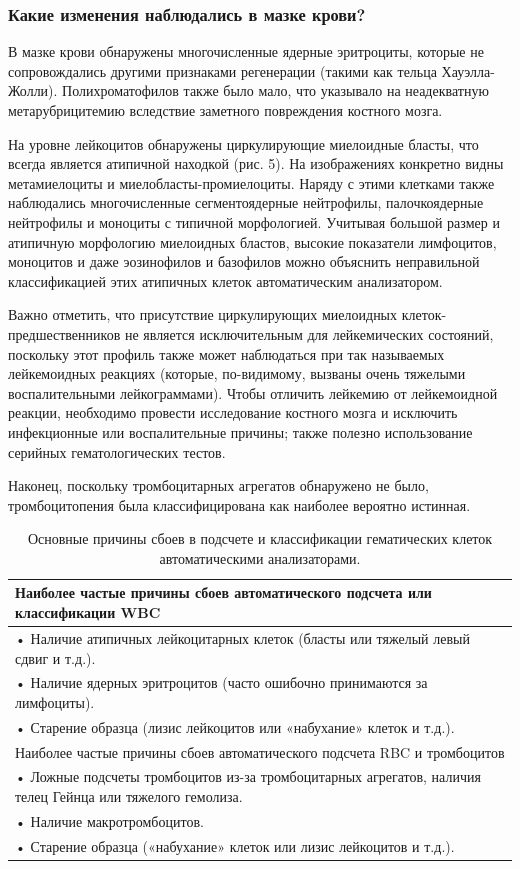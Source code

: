 \documentclass[a4paper,12pt]{book}
\begin{document}
\subsubsection*{Какие изменения наблюдались в мазке крови?}
В мазке крови обнаружены многочисленные ядерные эритроциты, которые не сопровождались другими признаками регенерации (такими как тельца Хауэлла-Жолли). Полихроматофилов также было мало, что указывало на неадекватную метарубрицитемию вследствие заметного повреждения костного мозга.

На уровне лейкоцитов обнаружены циркулирующие миелоидные бласты, что всегда является атипичной находкой (рис. 5). На изображениях конкретно видны метамиелоциты и миелобласты-промиелоциты. Наряду с этими клетками также наблюдались многочисленные сегментоядерные нейтрофилы, палочкоядерные нейтрофилы и моноциты с типичной морфологией. Учитывая большой размер и атипичную морфологию миелоидных бластов, высокие показатели лимфоцитов, моноцитов и даже эозинофилов и базофилов можно объяснить неправильной классификацией этих атипичных клеток автоматическим анализатором.

Важно отметить, что присутствие циркулирующих миелоидных клеток-предшественников не является исключительным для лейкемических состояний, поскольку этот профиль также может наблюдаться при так называемых лейкемоидных реакциях (которые, по-видимому, вызваны очень тяжелыми воспалительными лейкограммами). Чтобы отличить лейкемию от лейкемоидной реакции, необходимо провести исследование костного мозга и исключить инфекционные или воспалительные причины; также полезно использование серийных гематологических тестов.

Наконец, поскольку тромбоцитарных агрегатов обнаружено не было, тромбоцитопения была классифицирована как наиболее вероятно истинная.

\begin{table}[htbp]
\centering
\caption{Основные причины сбоев в подсчете и классификации гематических клеток автоматическими анализаторами.}
\begin{tabular}{p{14cm}}
\toprule
Наиболее частые причины сбоев автоматического подсчета или классификации WBC \\
\midrule
• Наличие атипичных лейкоцитарных клеток (бласты или тяжелый левый сдвиг и т.д.). \\
• Наличие ядерных эритроцитов (часто ошибочно принимаются за лимфоциты). \\
• Старение образца (лизис лейкоцитов или «набухание» клеток и т.д.). \\
\midrule
Наиболее частые причины сбоев автоматического подсчета RBC и тромбоцитов \\
\midrule
• Ложные подсчеты тромбоцитов из-за тромбоцитарных агрегатов, наличия телец Гейнца или тяжелого гемолиза. \\
• Наличие макротромбоцитов. \\
• Старение образца («набухание» клеток или лизис лейкоцитов и т.д.). \\
\bottomrule
\end{tabular}
\end{table}
\end{document}
